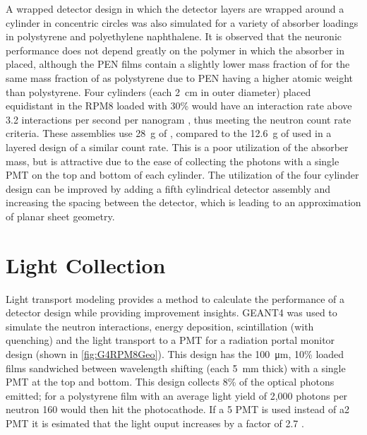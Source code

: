 A wrapped detector design in which the detector layers are wrapped around a cylinder in concentric circles was also simulated for a variety of absorber loadings in polystyrene and polyethylene naphthalene.
It is observed that the neuronic performance does not depend greatly on the polymer in which the absorber in placed, although the PEN films contain a slightly lower mass fraction of  for the same mass fraction of  as polystyrene due to PEN having a higher atomic weight than polystyrene.
Four cylinders (each \SI{2}{\cm} in outer diameter) placed equidistant in the RPM8 loaded with 30\%  would have an interaction rate above 3.2 interactions per second per nanogram , thus meeting the neutron count rate criteria. These assemblies use \SI{28}{\gram} of , compared to the \SI{12.6}{\gram} of  used in a layered design of a similar count rate.
This is a poor utilization of the absorber mass, but is attractive due to the ease of collecting the photons with a single PMT on the top and bottom of each cylinder.
The  utilization of the four cylinder design can be improved by adding a fifth cylindrical detector assembly and increasing the spacing between the detector, which is leading to an approximation of planar sheet geometry.


\section{Light Collection}
Light transport modeling provides a method to calculate the performance of a detector design while providing improvement insights.
GEANT4 was used to simulate the neutron interactions, energy deposition, scintillation (with quenching) and the light transport to a PMT for a radiation portal monitor design (shown in \autoref{fig:G4RPM8Geo}).
This design has the \SI{100}{\um}, 10\% loaded  films sandwiched between wavelength shifting (each \SI{5}{\mm} thick) with a single PMT at the top and bottom.
This design collects 8\% of the optical photons emitted; for a polystyrene film with an average light yield of 2,000 photons per neutron 160 would then hit the photocathode.
If a \SI{5}{\in} PMT is used instead of a\SI{2}{\in} PMT it is esimated that the light ouput increases by a factor of \num{2.7} \cite{pnnl_14283}.

